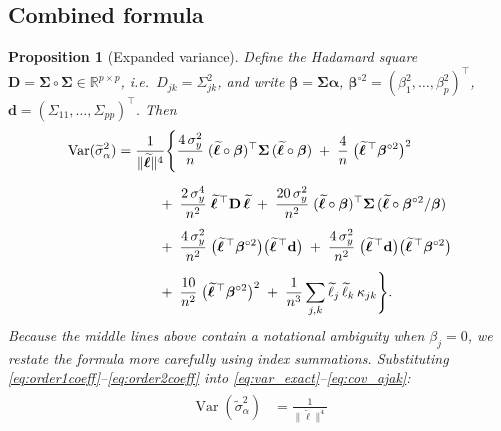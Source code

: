 \documentclass[11pt]{article}
\newcommand{\bbR}{\mathbb{R}}
\newcommand{\Var}{\operatorname{Var}}
\newcommand{\bSig}{\boldsymbol{\Sigma}}
\newcommand{\balpha}{\boldsymbol{\alpha}}
\newcommand{\bbeta}{\boldsymbol{\beta}}
\theoremstyle{plain}
\newtheorem{proposition}[theorem]{Proposition}
\theoremstyle{definition}
\theoremstyle{remark}
\begin{document}
\subsection{Combined formula}
\begin{proposition}[Expanded variance]\label{prop:expanded}
Define the Hadamard square
$\mathbf{D}=\bSig\circ\bSig\in\bbR^{p\times p}$, i.e.\
$D_{jk}=\Sigma_{jk}^2$,
and write $\bbeta = \bSig\balpha$, 
$\bbeta^{\circ 2} = (\beta_1^2,\dots,\beta_p^2)^\top$,
$\mathbf{d} = (\Sigma_{11},\dots,\Sigma_{pp})^\top$.
Then
\begin{align}
    \Var(\widetilde\sigma_\alpha^2)
    &= \frac{1}{\|\widetilde{\boldsymbol{\ell}}\|^4}
    \Biggl\{
    \frac{4\,\sigma_y^2}{n}\;
        (\widetilde{\boldsymbol{\ell}}\circ\bbeta)^\top
        \bSig\,
        (\widetilde{\boldsymbol{\ell}}\circ\bbeta)
    \;+\;
    \frac{4}{n}\;
        \bigl(\widetilde{\boldsymbol{\ell}}^{\,\top}
              \bbeta^{\circ 2}\bigr)^2
    \notag\\[6pt]
    &\qquad\quad
    +\;\frac{2\,\sigma_y^4}{n^2}\;
       \widetilde{\boldsymbol{\ell}}^{\,\top}
       \mathbf{D}\,
       \widetilde{\boldsymbol{\ell}}
    \;+\;\frac{20\,\sigma_y^2}{n^2}\;
       (\widetilde{\boldsymbol{\ell}}\circ\bbeta)^\top
       \bSig\,
       (\widetilde{\boldsymbol{\ell}}\circ\bbeta^{\circ 2}/\bbeta)
    \notag\\[4pt]
    &\qquad\quad
    +\;\frac{4\,\sigma_y^2}{n^2}\;
      \bigl(\widetilde{\boldsymbol{\ell}}^{\,\top}\bbeta^{\circ 2}\bigr)
      \bigl(\widetilde{\boldsymbol{\ell}}^{\,\top}\mathbf{d}\bigr)
    \;+\;\frac{4\,\sigma_y^2}{n^2}\;
      \bigl(\widetilde{\boldsymbol{\ell}}^{\,\top}\mathbf{d}\bigr)
      \bigl(\widetilde{\boldsymbol{\ell}}^{\,\top}\bbeta^{\circ 2}\bigr)
    \notag\\[4pt]
    &\qquad\quad
    +\;\frac{10}{n^2}\;
       \bigl(\widetilde{\boldsymbol{\ell}}^{\,\top}
             \bbeta^{\circ 2}\bigr)^2
    \;+\;\frac{1}{n^3}\sum_{j,k}
       \widetilde\ell_j\,\widetilde\ell_k\,\kappa_{jk}
    \Biggr\}.
    \label{eq:var_expanded_ugly}
\end{align}
Because the middle lines above contain a notational ambiguity when
$\beta_j=0$, we restate the formula more carefully using index
summations.  Substituting
\eqref{eq:order1coeff}--\eqref{eq:order2coeff} into
\eqref{eq:var_exact}--\eqref{eq:cov_ajak}:
\begin{align}
\boxed{
\begin{aligned}
    \Var(\widetilde\sigma_\alpha^2)
    &= \frac{1}{\|\widetilde{\boldsymbol{\ell}}\|^4}

\end{aligned}}
\end{align}
\end{proposition}
\end{document}
